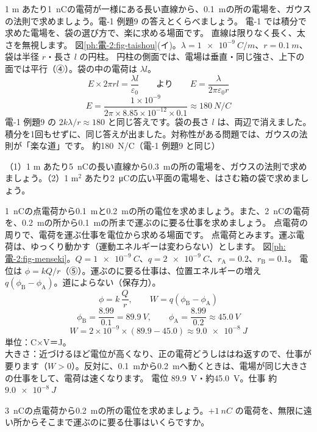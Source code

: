 \label{ph:電-2:ex2}
\begin{phreidai}
1 m あたり\qty{1}{nC}の電荷が一様にある長い直線から、\qty{0.1}{m}の所の電場を、ガウスの法則で求めましょう。電-1 例題9 の答えとくらべましょう。
\phbamen
電-1 では積分で求めた電場を、袋の選び方で、楽に求める場面です。
\phmushi
直線は限りなく長く、太さを無視します。
\phzu
図\ref{ph:電-2:fig-taishou}(イ)。$\lambda=\qty{1e-9}{C/m}$、$r=\qty{0.1}{m}$、袋は半径 $r$・長さ $l$ の円柱。
\phriyu
円柱の側面では、電場は垂直・同じ強さ、上下の面では平行（④）。袋の中の電荷は $\lambda l$。
\phtateru
\[E\times2\pi rl=\frac{\lambda l}{\varepsilon_0}\qquad\text{より}\qquad E=\frac{\lambda}{2\pi\varepsilon_0r}\]
\phtoku
\[E=\frac{1\times10^{-9}}{2\pi\times8.85\times10^{-12}\times0.1}\approx\qty{180}{N/C}\]
\phtashikame
電-1 例題9 の $2k\lambda/r\approx180$ と同じ答えです。袋の長さ $l$ は、両辺で消えました。積分を1回もせずに、同じ答えが出ました。対称性がある問題では、ガウスの法則が「楽な道」です。
\kotae 約\qty{180}{N/C}（電-1 例題9 と同じ）
\end{phreidai}
\begin{jibun}
（1）1 m あたり\qty{5}{nC}の長い直線から\qty{0.3}{m}の所の電場を、ガウスの法則で求めましょう。（2）1 m$^2$ あたり\qty{2}{\micro C}の広い平面の電場を、はさむ箱の袋で求めましょう。
\end{jibun}

\label{ph:電-2:ex3}
\begin{phreidai}[点電荷の周りの電位と仕事]
\qty{1}{nC}の点電荷から\qty{0.1}{m}と\qty{0.2}{m}の所の電位を求めましょう。また、\qty{2}{nC}の電荷を、\qty{0.2}{m}の所から\qty{0.1}{m}の所まで運ぶのに要る仕事を求めましょう。
\phbamen
点電荷の周りで、電荷を運ぶ仕事を電位から求める場面です。
\phmushi
点電荷とみます。運ぶ電荷は、ゆっくり動かす（運動エネルギーは変わらない）とします。
\phzu
図\ref{ph:電-2:fig-menseki}。$Q=\qty{1e-9}{C}$、$q=\qty{2e-9}{C}$、$r_{\mathrm A}=0.2$、$r_{\mathrm B}=0.1$。
\phriyu
電位は $\phi=kQ/r$（⑤）。運ぶのに要る仕事は、位置エネルギーの増え $q(\phi_{\mathrm B}-\phi_{\mathrm A})$。道によらない（保存力）。
\phtateru
\[\phi=k\,\frac{Q}{r},\qquad W=q(\phi_{\mathrm B}-\phi_{\mathrm A})\]
\phtoku
\[\phi_{\mathrm B}=\frac{8.99}{0.1}=\qty{89.9}{V},\qquad\phi_{\mathrm A}=\frac{8.99}{0.2}\approx\qty{45.0}{V}\]
\[W=2\times10^{-9}\times(89.9-45.0)\approx\qty{9.0e-8}{J}\]
\phtashikame
単位：C×V＝J。\\
大きさ：近づけるほど電位が高くなり、正の電荷どうしははね返すので、仕事が要ります（$W>0$）。反対に、\qty{0.1}{m}から\qty{0.2}{m}へ動くときは、電場が同じ大きさの仕事をして、電荷は速くなります。
\kotae 電位 \qty{89.9}{V}・約\qty{45.0}{V}。仕事 約 $\qty{9.0e-8}{J}$
\end{phreidai}
\begin{jibun}
\qty{3}{nC}の点電荷から\qty{0.2}{m}の所の電位を求めましょう。$+\qty{1}{nC}$ の電荷を、無限に遠い所からそこまで運ぶのに要る仕事はいくらですか。
\end{jibun}

